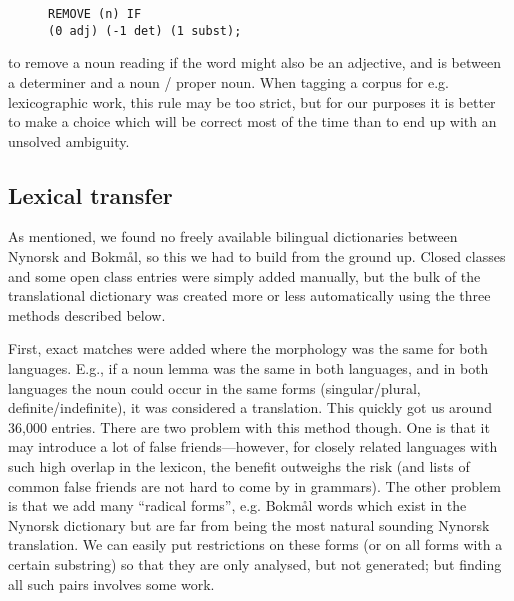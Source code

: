 \documentclass[11pt]{article}
\newcommand{\comment}[1]{\textbf{SKRIV} {\it #1}}
\renewcommand{\comment}[1]{}
\begin{document}
\begin{figure}[htp] {\tt \small  REMOVE (n) IF\\
    (0 adj) (-1 det) (1 subst);}
\end{figure}

to remove a noun reading if the word might also be an adjective,
and is between a determiner and a noun / proper noun. When tagging a
corpus for e.g. lexicographic work, this rule may be too strict, but
for our purposes it is better to make a choice which will be correct
most of the time than to end up with an unsolved ambiguity.

\comment{Hmm, actually, a better example might be the gjør=>gøyr vs
  gjer disambiguation, where we only choose `barks' if there's a dog
  in the sentence.}

\subsection{Lexical transfer}

As mentioned, we found no freely available bilingual dictionaries
between Nynorsk and Bokmål, so this we had to build from the ground
up. Closed classes and some open class entries were simply added
manually, but the bulk of the translational dictionary was created
more or less automatically using the three methods described below.

First, exact matches were added where the morphology was the same for
both languages. E.g., if a noun lemma was the same in both languages,
and in both languages the noun could occur in the same forms
(singular/plural, definite/indefinite), it was considered a
translation. This quickly got us around 36,000 entries. There are two
problem with this method though. One is that it may introduce a lot of
false friends—however, for closely related languages with such high
overlap in the lexicon, the benefit outweighs the risk (and lists of
common false friends are not hard to come by in grammars). The other
problem is that we add many ``radical forms'', e.g. Bokmål words which
exist in the Nynorsk dictionary but are far from being the most
natural sounding Nynorsk translation. We can easily put restrictions
on these forms (or on all forms with a certain substring) so that they
are only analysed, but not generated; but finding all such pairs
involves some work.
\end{document}
